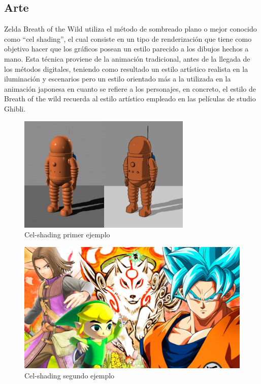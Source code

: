 \documentclass[12pt]{article}
\begin{document}
\subsection{Arte}

Zelda Breath of the Wild utiliza el método de sombreado plano o mejor conocido como “cel shading”, el cual consiste en un tipo de renderización que tiene como objetivo hacer que los gráficos posean un estilo parecido a los dibujos hechos a mano. Esta técnica proviene de la animación tradicional, antes de la llegada de los métodos digitales, teniendo como resultado un estilo artístico realista en la iluminación y escenarios pero un estilo orientado más a la utilizada en la animación japonesa en cuanto se refiere a los personajes, en concreto, el estilo de Breath of the wild recuerda al estilo artístico empleado en las películas de studio Ghibli.

    \begin{figure}[H]
      \centering
      \includegraphics[scale=2]{images/general images/Pintura/celshading.jpg}
      \caption{\small Cel-shading primer ejemplo}
    \end{figure}

        \begin{figure}[H]
      \centering
      \includegraphics[scale=0.4]{images/general images/Pintura/celshading2.jpg}
      \caption{\small Cel-shading segundo ejemplo}
    \end{figure}
\end{document}
